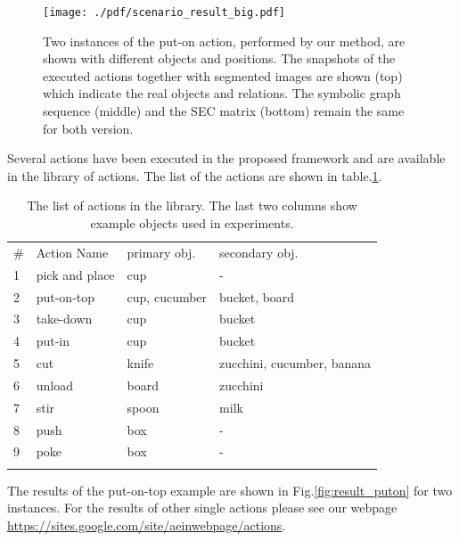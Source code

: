 \begin{figure}
      \centering
      \texttt{[image: ./pdf/scenario\_result\_big.pdf]}
      \caption{ Two instances of the put-on action, performed by our method, are shown with different objects and positions. 
The snapshots of the executed actions together with segmented images are shown (top) which indicate the real objects and relations.
The symbolic graph sequence (middle) and the SEC matrix (bottom) remain the same for both version.
}
      \label{fig:scenario_result}
\end{figure}
Several actions have been executed in the proposed framework and are available in the library of actions.
The list of the actions are shown in table.\ref{tab:action_list}.
\begin{table}
\caption{The list of actions in the library. The last two columns show example objects used in experiments.}
\label{tab:action_list}       %
\begin{tabular}{llll}
\hline\noalign{\smallskip}
\# & Action Name & primary obj. & secondary obj. \\
\noalign{\smallskip}\hline\noalign{\smallskip}
1 & pick and place  & cup & - \\
2 & put-on-top & cup, cucumber & bucket, board \\ 
3 & take-down  & cup & bucket \\
4 & put-in  & cup & bucket \\
5 & cut  & knife & zucchini, cucumber, banana \\
6 & unload  & board & zucchini \\
7 & stir  & spoon & milk \\
8 & push  & box & - \\
9 & poke  & box & -\\



\noalign{\smallskip}\hline
\end{tabular}
\end{table}

The results of the put-on-top example are shown in Fig.\ref{fig:result_puton} for two instances.
For the results of other single actions please see our webpage \url{https://sites.google.com/site/aeinwebpage/actions}.

